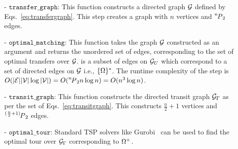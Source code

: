 \begin{itemize}
\item[-] $ \mathtt{transfer\_graph} $: This function constructs a directed graph $ \graph $ defined by Eqs.~\ref{eq:transfergraph}. This step creates a graph with $ n $ vertices and $ \permu[n]{2} $ edges.
\item[-] $ \mathtt{optimal\_matching} $: This function takes the graph $ \graph $ constructed as an argument and returns the unordered set of edges, corresponding to the set of optimal transfers over $ \graph $. 
is a subset of edges on $ \graph_U $ which correspond to a set of directed edges on $ \graph $ i.e., $ \scomaset^* $. The runtime complexity of the step is $ O(|\edges||\nodes|\log|\nodes|) = O(\permu[n]{2}n\log n ) = O(n^3\log n)$.
\item[-] $ \mathtt{transit\_graph} $: This function constructs the directed transit graph $ \tspgraph $ as per the set of Eqs.~\ref{eq:transitgraph}. This constructs $ \frac{n}{2} + 1 $ vertices and $ \permu[(\frac{n}{2} + 1)]{2} $ edges.
\item[-]  $\mathtt{optimal\_tour}  $: Standard TSP solvers like Gurobi~\cite{gurobi} can be used to find the  
optimal tour over $ \tspgraph $ corresponding to $ \scoma^+ $.
\end{itemize}




